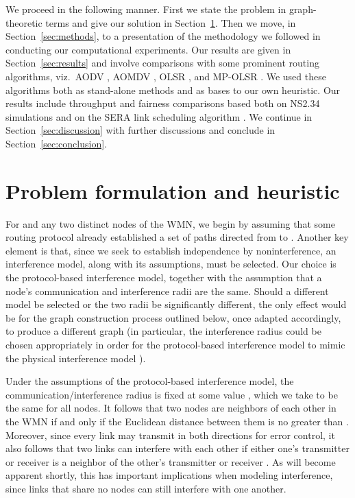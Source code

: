 \documentclass{article}
\begin{document}
We proceed in the following manner. First we state the problem in
graph-theoretic terms and give our solution in Section~\ref{sec:mra}. Then we
move, in Section~\ref{sec:methods}, to a presentation of the methodology we
followed in conducting our computational experiments. Our results are given in
Section~\ref{sec:results} and involve comparisons with some prominent routing
algorithms, viz.\ AODV \cite{Perkins1999}, AOMDV \cite{Marina2002}, OLSR
\cite{Jacquet2001}, and MP-OLSR \cite{Yi2011}. We used these algorithms both as
stand-alone methods and as bases to our own heuristic. Our results include
throughput and fairness \cite{Jain1998} comparisons based both on NS2.34
\cite{ns2} simulations and on the SERA link scheduling algorithm
\cite{Fabio2012}. We continue in Section~\ref{sec:discussion} with further
discussions and conclude in Section~\ref{sec:conclusion}.

\section{Problem formulation and heuristic}\label{sec:mra}

For  and  any two distinct nodes of the WMN, we begin by assuming that
some routing protocol already established a set  of paths
directed from  to . Another key element is that, since we seek to
establish independence by noninterference, an interference model, along with its
assumptions, must be selected. Our choice is the protocol-based interference
model, together with the assumption that a node's communication and interference
radii are the same. Should a different model be selected or the two radii be
significantly different, the only effect would be for the graph construction
process outlined below, once adapted accordingly, to produce a different graph
(in particular, the interference radius could be chosen appropriately in order
for the protocol-based interference model to mimic the physical interference
model \cite{Shi2009}).

Under the assumptions of the protocol-based interference model, the
communication/interference radius is fixed at some value , which we take to
be the same for all nodes. It follows that two nodes are neighbors of each other
in the WMN if and only if the Euclidean distance between them is no greater than
. Moreover, since every link may transmit in both directions for error
control, it also follows that two links can interfere with each other if either
one's transmitter or receiver is a neighbor of the other's transmitter or
receiver \cite{Balakrishnan2004}. As will become apparent shortly, this has
important implications when modeling interference, since links that share no
nodes can still interfere with one another.
\end{document}
